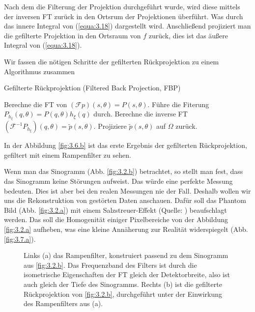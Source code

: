 Nach dem die Filterung der Projektion durchgeführt wurde, wird diese mittels der inversen FT zurück in den Ortsrum der Projektionen überführt. Was durch das innere Integral von (\ref{equa:3.18}) dargestellt wird. Anschließend projiziert man die gefilterte Projektion in den Ortsraum von $f$ zurück, dies ist das äußere Integral von (\ref{equa:3.18}). 

Wir fassen die nötigen Schritte der gefilterten Rückprojektion zu einem Algorithmus zusammen
\begin{algorithm}
	\caption{Gefilterte Rückprojektion (Filtered Back Projection, FBP)}
	\begin{algorithmic}[1]	
		\State Berechne die FT von $(\mathcal{F}p)(s, \theta) = P(s, \theta)$.
		\State Führe die Fiterung $P_{h_{\xi}}(q, \theta) = P(q, \theta)h_{\xi}(q)$ durch.
		\State Berechne die inverse FT $(\mathcal{F}^{-1}P_{h_{\xi}})(q, \theta) = \tilde{p}(s,\theta)$.
		\State Projiziere $\tilde{p}(s,\theta)$ auf $\Omega$ zurück. 
	\end{algorithmic}
	\label{alg:3.1}
\end{algorithm}

In der Abbildung \ref{fig:3.6.b} ist das erste Ergebnis der gefilterten Rückprojektion, gefiltert mit einem Rampenfilter zu sehen. 

Wenn man das Sinogramm (Abb. \ref{fig:3.2.b}) betrachtet, so stellt man fest, dass das Sinogramm keine Störungen aufweist. Das würde eine perfekte Messung bedeuten. Dies ist aber bei den realen Messungen nie der Fall. Deshalb wollen wir uns die Rekonstruktion von gestörten Daten anschauen. Dafür soll das Phantom Bild (Abb. \ref{fig:3.2.a}) mit einem Salzstreuer-Effekt (Quelle: \MATLAB) beaufschlagt werden. Das soll die Homogenität einiger Pixelbereiche von der Abbildung \ref{fig:3.2.a} aufheben, was eine kleine Annäherung zur Realität widerspiegelt (Abb. \ref{fig:3.7.a}).  
\begin{figure}[!h]
	\begin{center}
	\end{center}
	\caption{ Links (a) das Rampenfilter, konstruiert passend zu dem Sinogramm aus \ref{fig:3.2.b}. Das Frequenzband des Filters ist durch die isometrische Eigenschaften der FT gleich der Detektorbreite, also ist auch gleich der Tiefe des Sinogramms. Rechts (b) ist die gefilterte Rückprojektion von \ref{fig:3.2.b}, durchgeführt unter der Einwirkung des Rampenfilters aus (a).}
	\label{fig:3.6}
\end{figure} 

